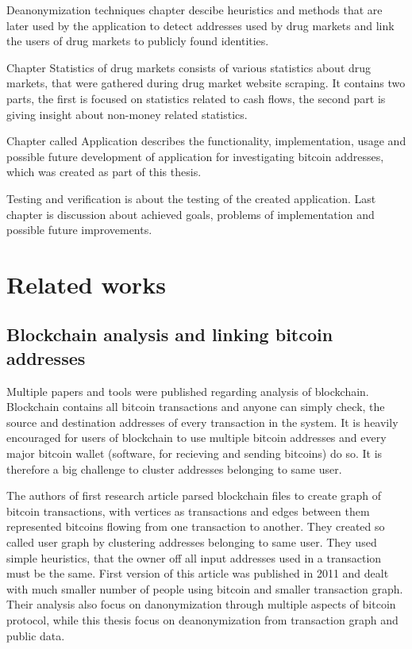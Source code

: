 \documentclass[
  digital, %
  table,   %
  lof,     %
  lot,     %
  oneside
]{fithesis3}
\begin{document}
Deanonymization techniques chapter descibe heuristics and methods that are later used by the application to detect 
addresses used by drug markets and link the users of drug markets to publicly found identities.

Chapter Statistics of drug markets consists of various statistics about drug markets, that were gathered during drug market website scraping.
It contains two parts, the first is focused on statistics related to cash flows, the second part is giving insight about non-money related statistics.

Chapter called Application describes the functionality, implementation, usage and 
possible future development of application for investigating bitcoin addresses, which was created as part of this thesis.

Testing and verification is about the testing of the created application.
Last chapter is discussion about achieved goals, problems of implementation and possible future improvements.

\chapter{Related works}
\section{Blockchain analysis and linking bitcoin addresses}

Multiple papers and tools were published regarding analysis of blockchain.
Blockchain contains all bitcoin transactions and anyone can simply check,
the source and destination addresses of every transaction in the system.
It is heavily encouraged for users of blockchain to use multiple bitcoin addresses
 and every major bitcoin wallet (software, for recieving and sending bitcoins) do so.
 It is therefore a big challenge to cluster addresses belonging to same user.
 
The authors of first research article \parencite{reid2013analysis}
 parsed blockchain files to create graph of bitcoin transactions, with vertices as transactions
 and edges between them represented bitcoins flowing from one transaction to another.
 They created so called user graph by clustering addresses belonging to same user.
 They used simple heuristics, that the owner off all input addresses used
 in a transaction must be the same. First version of this article  
was published in 2011 and dealt with much smaller number of people using bitcoin and smaller transaction graph.
Their analysis also focus on danonymization through multiple aspects of bitcoin protocol,
while this thesis focus on deanonymization from transaction graph and public data.
\end{document}

